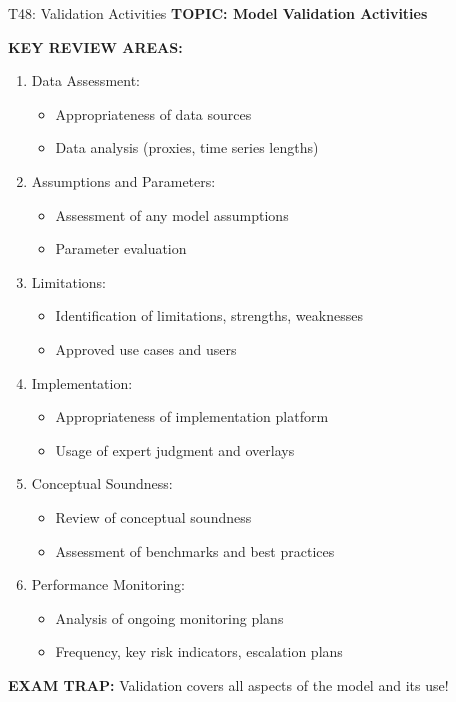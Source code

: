 \documentclass[8pt]{beamer}
\begin{document}
	\begin{frame}{T48: Validation Activities}
		\fontsize{6.5}{7.5}\selectfont
		\textbf{TOPIC: Model Validation Activities}
		
		\vspace{0.1cm}
		\textbf{KEY REVIEW AREAS:}
		\begin{enumerate}
			\item \textcolor{myblue}{Data Assessment:}
			\begin{itemize}
				\item Appropriateness of data sources
				\item Data analysis (proxies, time series lengths)
			\end{itemize}
			\item \textcolor{myblue}{Assumptions and Parameters:}
			\begin{itemize}
				\item Assessment of any model assumptions
				\item Parameter evaluation
			\end{itemize}
			\item \textcolor{myblue}{Limitations:}
			\begin{itemize}
				\item Identification of limitations, strengths, weaknesses
				\item Approved use cases and users
			\end{itemize}
			\item \textcolor{myblue}{Implementation:}
			\begin{itemize}
				\item Appropriateness of implementation platform
				\item Usage of expert judgment and overlays
			\end{itemize}
			\item \textcolor{myblue}{Conceptual Soundness:}
			\begin{itemize}
				\item Review of conceptual soundness
				\item Assessment of benchmarks and best practices
			\end{itemize}
			\item \textcolor{myblue}{Performance Monitoring:}
			\begin{itemize}
				\item Analysis of ongoing monitoring plans
				\item Frequency, key risk indicators, escalation plans
			\end{itemize}
		\end{enumerate}
		
		\textcolor{myred}{\textbf{EXAM TRAP:}} Validation covers \textcolor{myblue}{all aspects of the model and its use}!
	\end{frame}
	
\end{document}
